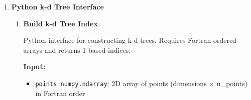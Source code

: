 \begin{enumerate}
\begin{enumerate}
\begin{itemize}
                    \item \texttt{lower\_bound float}: Lower bound of range (inclusive)
                          
                    \item \texttt{upper\_bound float}: Upper bound of range (inclusive)
                  \end{itemize}
                  \textbf{Output:}
                  \begin{itemize}
                    \item \texttt{Dictionary}: (matching\_indices, count) where indices
                          are 1-based
                  \end{itemize}
                  \begin{lstlisting}[language=Python]
# + 1 is added because of 0-based indexing. If the indices are already 1 based, this is not necessary
res = bst_range_query(values, indices + 1, lower_bound, upper_bound)
                  \end{lstlisting}
                  
            \item \textbf{Get Sorted Value}
                  
                  \textbf{Note:} This function is not implemented as a separate Python
                  function. Use direct array indexing instead:
                  \begin{lstlisting}[language=Python]
value = values[indices[position]]  # position is 1-based
                  \end{lstlisting}
          \end{enumerate}
          
    \item \textbf{Python k-d Tree Interface}
          
          \begin{enumerate}
            \item \textbf{Build k-d Tree Index}
                  
                  Python interface for constructing k-d trees. Requires Fortran-ordered
                  arrays and returns 1-based indices.
                  
                  \textbf{Input:}
                  \begin{itemize}
                    \item \texttt{points numpy.ndarray}: 2D array of points (dimensions
                          × n\_points) in Fortran order
                          

\end{itemize}
\end{enumerate}
\end{enumerate}
